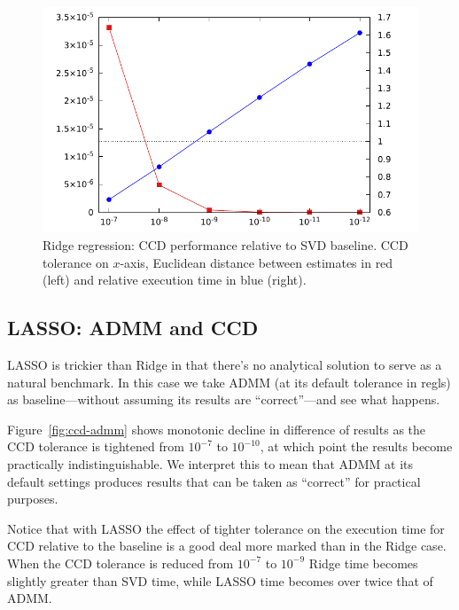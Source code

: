 \documentclass{article}
\begin{document}
\begin{figure}[htbp]
\begin{center}
\includegraphics[scale=0.9]{ccd_svd.pdf}
\caption{Ridge regression: CCD performance relative to SVD
  baseline. CCD tolerance on $x$-axis, Euclidean distance between
  estimates in red (left) and relative execution time in blue
  (right).}
\label{fig:ccd-svd}
\end{center}
\end{figure}

\subsection*{LASSO: ADMM and CCD}

LASSO is trickier than Ridge in that there's no analytical solution to
serve as a natural benchmark. In this case we take ADMM (at its
default tolerance in \textsf{regls}) as baseline---without assuming
its results are ``correct''---and see what happens.

Figure~\ref{fig:ccd-admm} shows monotonic decline in difference of
results as the CCD tolerance is tightened from $10^{-7}$ to
$10^{-10}$, at which point the results become practically
indistinguishable. We interpret this to mean that ADMM at its default
settings produces results that can be taken as ``correct'' for
practical purposes.

Notice that with LASSO the effect of tighter tolerance on the
execution time for CCD relative to the baseline is a good deal more
marked than in the Ridge case. When the CCD tolerance is reduced from
$10^{-7}$ to $10^{-9}$ Ridge time becomes slightly greater than SVD
time, while LASSO time becomes over twice that of ADMM.
\end{document}
